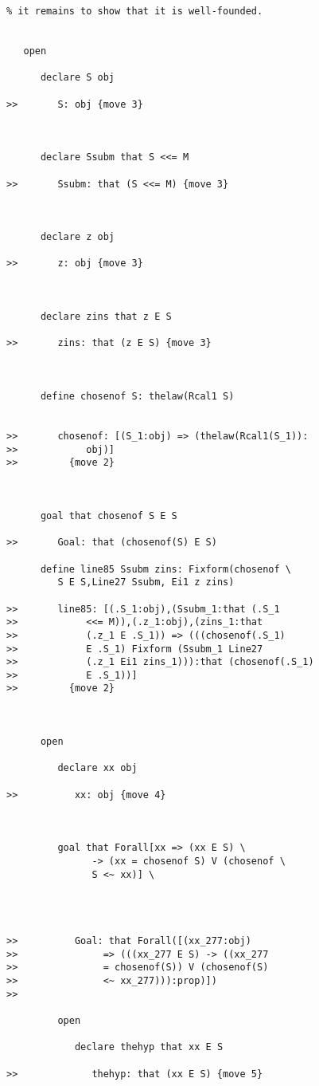 \documentclass[12pt]{article}
\begin{document}
\begin{verbatim}
% it remains to show that it is well-founded.


   open

      declare S obj

>>       S: obj {move 3}



      declare Ssubm that S <<= M

>>       Ssubm: that (S <<= M) {move 3}



      declare z obj

>>       z: obj {move 3}



      declare zins that z E S

>>       zins: that (z E S) {move 3}



      define chosenof S: thelaw(Rcal1 S)


>>       chosenof: [(S_1:obj) => (thelaw(Rcal1(S_1)):
>>            obj)]
>>         {move 2}



      goal that chosenof S E S

>>       Goal: that (chosenof(S) E S)

      define line85 Ssubm zins: Fixform(chosenof \
         S E S,Line27 Ssubm, Ei1 z zins)

>>       line85: [(.S_1:obj),(Ssubm_1:that (.S_1
>>            <<= M)),(.z_1:obj),(zins_1:that
>>            (.z_1 E .S_1)) => (((chosenof(.S_1)
>>            E .S_1) Fixform (Ssubm_1 Line27
>>            (.z_1 Ei1 zins_1))):that (chosenof(.S_1)
>>            E .S_1))]
>>         {move 2}



      open

         declare xx obj

>>          xx: obj {move 4}



         goal that Forall[xx => (xx E S) \
               -> (xx = chosenof S) V (chosenof \
               S <~ xx)] \
            



>>          Goal: that Forall([(xx_277:obj)
>>               => (((xx_277 E S) -> ((xx_277
>>               = chosenof(S)) V (chosenof(S)
>>               <~ xx_277))):prop)])
>>            

         open

            declare thehyp that xx E S

>>             thehyp: that (xx E S) {move 5}




\end{verbatim}
\end{document}
